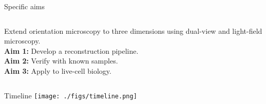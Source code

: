 \documentclass[presentation]{beamer}
\begin{document}
\begin{frame}{Specific aims}
  \begin{columns}
    \begin{column}{0.75\textwidth}
    Extend orientation microscopy to three dimensions
    using dual-view and light-field microscopy.\\ \vspace{1em}
    \textbf{Aim 1:} 
    Develop a reconstruction pipeline.\\ \vspace{1em}
      \textbf{Aim 2:}
    Verify with known samples.\\ \vspace{1em}
      \textbf{Aim 3:}
    Apply to live-cell biology.  
    \end{column}
  \end{columns}
\end{frame}

\begin{frame}{Timeline}
  \centering
  \texttt{[image: ./figs/timeline.png]}
\end{frame}
\end{document}
